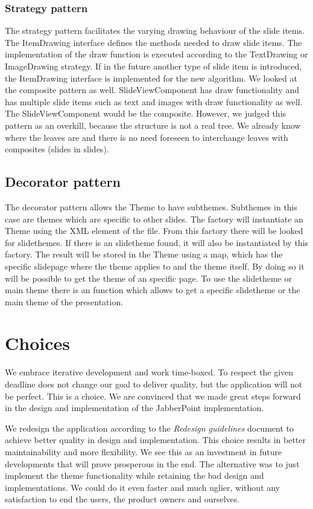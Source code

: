 \documentclass[a4paper]{article}
\begin{document}
\subsubsection{Strategy pattern}
The strategy pattern facilitates the varying drawing behaviour of the slide items. The ItemDrawing interface defines the methods needed to draw slide items. The implementation of the draw function is executed according to the TextDrawing or ImageDrawing strategy. If  in the future another type of slide item is introduced, the ItemDrawing interface is implemented for the new algorithm. We looked at the composite pattern as well. SlideViewComponent has draw functionality and has multiple slide items such as text and images with draw functionality as well. The SlideViewComponent would be the composite. However, we judged this pattern as an overkill, because the structure is not a real tree. We already know where the leaves are and there is no need foreseen to interchange leaves with composites (slides in slides).

\subsection{Decorator pattern}
The decorator pattern allows the Theme to have subthemes. Subthemes in this case are themes which are specific to other slides. The factory will instantiate an Theme using the XML element of the file. From this factory there will be looked for slidethemes. If there is an slidetheme found, it will also be instantiated by this factory. The result will be stored in the Theme using a map, which has the specific slidepage where the theme applies to and the theme itself. By doing so it will be possible to get the theme of an specific page. To use the slidetheme or main theme there is an function which allows to get a specific slidetheme or the main theme of the presentation.

\section{Choices}
We embrace iterative development and work time-boxed. To respect the given deadline does not change our goal to deliver quality, but the application will not be perfect. This is a choice. We are convinced that we made great steps forward in the design and implementation of the JabberPoint implementation.

We redesign the application according to the \textit{Redesign guidelines} document to achieve better quality in design and implementation. This choice results in better maintainability and more flexibility. We see this as an investment in future developments that will prove prosperous in the end. The alternative was to just implement the theme functionality while retaining the bad design and implementations. We could do it even faster and much uglier, without any satisfaction to end the users, the product owners and ourselves.
\end{document}
